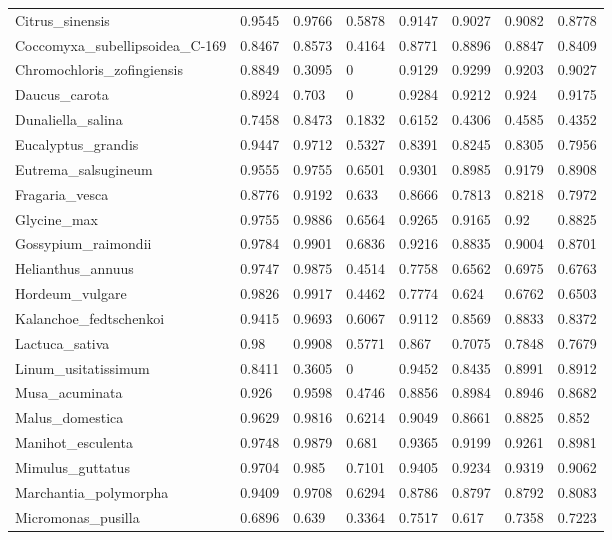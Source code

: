 \documentclass{article}
\begin{document}
\begin{table}[!h]
{\begin{tabular}{@{}llllllll@{}}
Citrus\_sinensis & 0.9545 & 0.9766 & 0.5878 & 0.9147 & 0.9027 & 0.9082 & 0.8778 \\
Coccomyxa\_subellipsoidea\_C-169 & 0.8467 & 0.8573 & 0.4164 & 0.8771 & 0.8896 & 0.8847 & 0.8409 \\
Chromochloris\_zofingiensis & 0.8849 & 0.3095 & 0 & 0.9129 & 0.9299 & 0.9203 & 0.9027 \\
Daucus\_carota & 0.8924 & 0.703 & 0 & 0.9284 & 0.9212 & 0.924 & 0.9175 \\
Dunaliella\_salina & 0.7458 & 0.8473 & 0.1832 & 0.6152 & 0.4306 & 0.4585 & 0.4352 \\
Eucalyptus\_grandis & 0.9447 & 0.9712 & 0.5327 & 0.8391 & 0.8245 & 0.8305 & 0.7956 \\
Eutrema\_salsugineum & 0.9555 & 0.9755 & 0.6501 & 0.9301 & 0.8985 & 0.9179 & 0.8908 \\
Fragaria\_vesca & 0.8776 & 0.9192 & 0.633 & 0.8666 & 0.7813 & 0.8218 & 0.7972 \\
Glycine\_max & 0.9755 & 0.9886 & 0.6564 & 0.9265 & 0.9165 & 0.92 & 0.8825 \\
Gossypium\_raimondii & 0.9784 & 0.9901 & 0.6836 & 0.9216 & 0.8835 & 0.9004 & 0.8701 \\
Helianthus\_annuus & 0.9747 & 0.9875 & 0.4514 & 0.7758 & 0.6562 & 0.6975 & 0.6763 \\
Hordeum\_vulgare & 0.9826 & 0.9917 & 0.4462 & 0.7774 & 0.624 & 0.6762 & 0.6503 \\
Kalanchoe\_fedtschenkoi & 0.9415 & 0.9693 & 0.6067 & 0.9112 & 0.8569 & 0.8833 & 0.8372 \\
Lactuca\_sativa & 0.98 & 0.9908 & 0.5771 & 0.867 & 0.7075 & 0.7848 & 0.7679 \\
Linum\_usitatissimum & 0.8411 & 0.3605 & 0 & 0.9452 & 0.8435 & 0.8991 & 0.8912 \\
Musa\_acuminata & 0.926 & 0.9598 & 0.4746 & 0.8856 & 0.8984 & 0.8946 & 0.8682 \\
Malus\_domestica & 0.9629 & 0.9816 & 0.6214 & 0.9049 & 0.8661 & 0.8825 & 0.852 \\
Manihot\_esculenta & 0.9748 & 0.9879 & 0.681 & 0.9365 & 0.9199 & 0.9261 & 0.8981 \\
Mimulus\_guttatus & 0.9704 & 0.985 & 0.7101 & 0.9405 & 0.9234 & 0.9319 & 0.9062 \\
Marchantia\_polymorpha & 0.9409 & 0.9708 & 0.6294 & 0.8786 & 0.8797 & 0.8792 & 0.8083 \\
Micromonas\_pusilla & 0.6896 & 0.639 & 0.3364 & 0.7517 & 0.617 & 0.7358 & 0.7223 \\

\end{tabular}}
\end{table}
\end{document}
